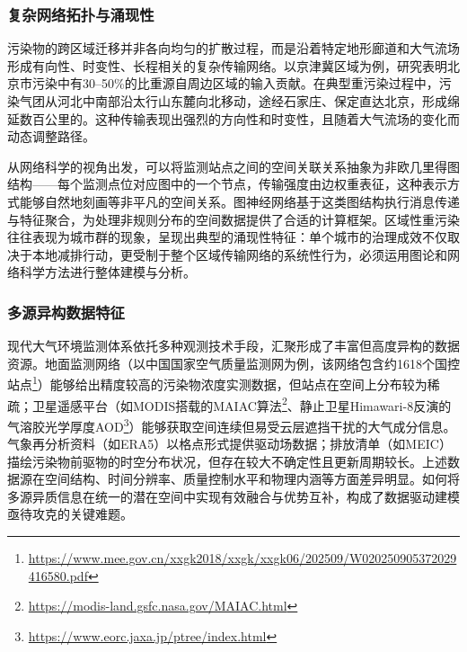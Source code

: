 \subsubsection{复杂网络拓扑与涌现性}

污染物的跨区域迁移并非各向均匀的扩散过程，而是沿着特定地形廊道和大气流场形成有向性、时变性、长程相关的复杂传输网络\citep{quan2020regional,chen2020influence}。以京津冀区域为例，研究表明北京市\PM 污染中有30--50\%的比重源自周边区域的输入贡献\citep{chang2018assessment}。在典型重污染过程中，污染气团从河北中南部沿太行山东麓向北移动，途经石家庄、保定直达北京，形成绵延数百公里的\citep{yin2025regional,quan2020regional,cn_liulin2017wrfchem}。这种传输表现出强烈的方向性和时变性，且随着大气流场的变化而动态调整路径。

从网络科学的视角出发，可以将监测站点之间的空间关联关系抽象为非欧几里得图结构——每个监测点位对应图中的一个节点，传输强度由边权重表征，这种表示方式能够自然地刻画等非平凡的空间关系\citep{wang2020pm2,wu2020comprehensive}。图神经网络基于这类图结构执行消息传递与特征聚合，为处理非规则分布的空间数据提供了合适的计算框架\citep{kipf2017semi,velivckovic2018graph}。区域性重污染往往表现为城市群的现象，呈现出典型的涌现性特征：单个城市的治理成效不仅取决于本地减排行动，更受制于整个区域传输网络的系统性行为\citep{wang2017higher}，必须运用图论和网络科学方法进行整体建模与分析。

\subsubsection{多源异构数据特征}

现代大气环境监测体系依托多种观测技术手段，汇聚形成了丰富但高度异构的数据资源\citep{geng2021tracking}。地面监测网络（以中国国家空气质量监测网为例，该网络包含约1618个国控站点\footnote{\url{https://www.mee.gov.cn/xxgk2018/xxgk/xxgk06/202509/W020250905372029416580.pdf}}）能够给出精度较高的污染物浓度实测数据，但站点在空间上分布较为稀疏；卫星遥感平台（如MODIS搭载的MAIAC算法\footnote{\url{https://modis-land.gsfc.nasa.gov/MAIAC.html}}、静止卫星Himawari-8反演的气溶胶光学厚度AOD\footnote{\url{https://www.eorc.jaxa.jp/ptree/index.html}}）能够获取空间连续但易受云层遮挡干扰的大气成分信息\citep{xiao2017full,wei2021himawari}。气象再分析资料（如ERA5）以格点形式提供驱动场数据\citep{hersbach2020era5}；排放清单（如MEIC）描绘污染物前驱物的时空分布状况，但存在较大不确定性且更新周期较长\citep{zheng2018trends}。上述数据源在空间结构、时间分辨率、质量控制水平和物理内涵等方面差异明显。如何将多源异质信息在统一的潜在空间中实现有效融合与优势互补，构成了数据驱动建模亟待攻克的关键难题。

